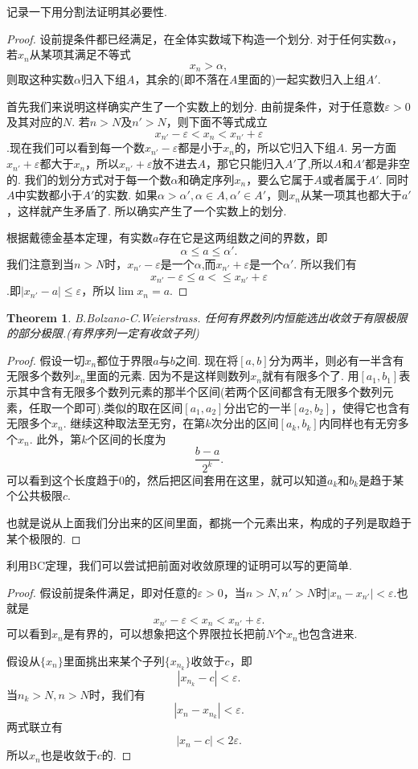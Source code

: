 \documentclass{article}
\newtheorem{theorem}{Theorem}[section]
\begin{document}
记录一下用分割法证明其必要性.
\begin{proof}
设前提条件都已经满足，在全体实数域下构造一个划分. 对于任何实数$\alpha$，若$x_n$从某项其满足不等式\[x_n > \alpha,\]则取这种实数$\alpha$归入下组$A$，其余的(即不落在$A$里面的)一起实数归入上组$A'$.

首先我们来说明这样确实产生了一个实数上的划分. 由前提条件，对于任意数$\varepsilon>0$及其对应的$N$. 若$n > N$及$n' > N$，则下面不等式成立\[x_{n'} - \varepsilon < x_n < x_{n'}+\varepsilon\].现在我们可以看到每一个数$x_{n'} - \varepsilon$都是小于$x_n$的，所以它归入下组$A$. 另一方面$x_{n'}+\varepsilon$都大于$x_n$，所以$x_{n'}+\varepsilon$放不进去$A$，那它只能归入$A'$了,所以$A$和$A'$都是非空的. 我们的划分方式对于每一个数$\alpha$和确定序列$x_n$，要么它属于$A$或者属于$A'$. 同时$A$中实数都小于$A'$的实数. 如果$\alpha > \alpha', \alpha \in A , \alpha' \in A'$，则$x_n$从某一项其也都大于$a'$，这样就产生矛盾了. 所以确实产生了一个实数上的划分.

根据戴德金基本定理，有实数$a$存在它是这两组数之间的界数，即\[\alpha \leq a \leq \alpha'.\]我们注意到当$n > N$时，$x_{n'} - \varepsilon$是一个$\alpha$,而$x_{n'} +\varepsilon$是一个$\alpha'$. 所以我们有\[x_{n'} - \varepsilon \leq a < \leq x_{n'} + \varepsilon\].即$|x_{n'}-a| \leq \varepsilon$，所以$\lim x_n = a$.
\end{proof}

\begin{theorem}
B.Bolzano-C.Weierstrass. 任何有界数列内恒能选出收敛于有限极限的部分极限.(有界序列一定有收敛子列)
\end{theorem}

\begin{proof}
假设一切$x_n$都位于界限$a$与$b$之间. 现在将$[a,b]$分为两半，则必有一半含有无限多个数列$x_n$里面的元素. 因为不是这样则数列$x_n$就有有限多个了. 用$[a_1,b_1]$表示其中含有无限多个数列元素的那半个区间(若两个区间都含有无限多个数列元素，任取一个即可).类似的取在区间$[a_1,a_2]$分出它的一半$[a_2,b_2]$，使得它也含有无限多个$x_n$. 继续这种取法至无穷，在第$k$次分出的区间$[a_k,b_k]$内同样也有无穷多个$x_n$. 此外，第$k$个区间的长度为\[\frac{b-a}{2^k}.\]可以看到这个长度趋于$0$的，然后把区间套用在这里，就可以知道$a_k$和$b_k$是趋于某个公共极限$c$.

也就是说从上面我们分出来的区间里面，都挑一个元素出来，构成的子列是取趋于某个极限的.
\end{proof}

利用BC定理，我们可以尝试把前面对收敛原理的证明可以写的更简单.

\begin{proof}
假设前提条件满足，即对任意的$\varepsilon > 0$，当$n > N,n'>N$时$|x_n-x_{n'}|< \varepsilon$.也就是\[ x_{n'} -\varepsilon < x_n < x_{n'} + \varepsilon.\]可以看到$x_n$是有界的，可以想象把这个界限拉长把前$N$个$x_n$也包含进来.

假设从$\{x_n\}$里面挑出来某个子列$\{x_{n_k}\}$收敛于$c$，即\[|x_{n_k} -c| < \varepsilon.\]当$n_k > N,n > N$时，我们有\[|x_n - x_{n_k}| < \varepsilon.\]两式联立有\[|x_n - c| < 2\varepsilon.\]所以$x_n$也是收敛于$c$的.
\end{proof}
\end{document}
